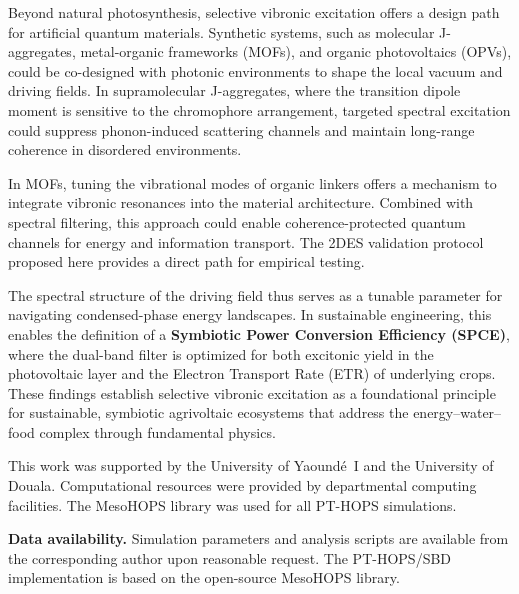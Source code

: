 \documentclass[journal=jpcl,manuscript=letter]{achemso}
\begin{document}
Beyond natural photosynthesis, selective vibronic excitation offers a design path for artificial quantum materials. Synthetic systems, such as molecular J-aggregates, metal-organic frameworks (MOFs), and organic photovoltaics (OPVs), could be co-designed with photonic environments to shape the local vacuum and driving fields. In supramolecular J-aggregates, where the transition dipole moment is sensitive to the chromophore arrangement, targeted spectral excitation could suppress phonon-induced scattering channels and maintain long-range coherence in disordered environments.

In MOFs, tuning the vibrational modes of organic linkers offers a mechanism to integrate vibronic resonances into the material architecture. Combined with spectral filtering, this approach could enable coherence-protected quantum channels for energy and information transport. The 2DES validation protocol proposed here provides a direct path for empirical testing.

The spectral structure of the driving field thus serves as a tunable parameter for navigating condensed-phase energy landscapes. In sustainable engineering, this enables the definition of a \textbf{Symbiotic Power Conversion Efficiency (SPCE)}, where the dual-band filter is optimized for both excitonic yield in the photovoltaic layer and the Electron Transport Rate (ETR) of underlying crops. These findings establish selective vibronic excitation as a foundational principle for sustainable, symbiotic agrivoltaic ecosystems that address the energy--water--food complex through fundamental physics.


\begin{acknowledgement}
This work was supported by the University of Yaoundé~I and the University of Douala. Computational resources were provided by departmental computing facilities. The MesoHOPS library was used for all PT-HOPS simulations.
\end{acknowledgement}


\textbf{Data availability.} Simulation parameters and analysis scripts are available from the corresponding author upon reasonable request. The PT-HOPS/SBD implementation is based on the open-source MesoHOPS library.
\end{document}
